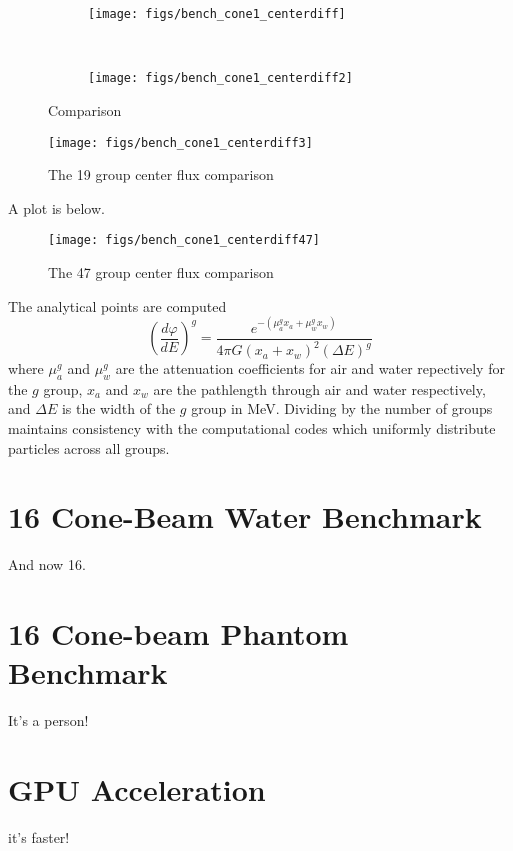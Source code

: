 \begin{figure}
    \centering
    \begin{subfigure}[b]{0.45\textwidth}
        \texttt{[image: figs/bench\_cone1\_centerdiff]}
        \caption{}
        \label{fig:bench_cone1_centerdiff}
    \end{subfigure}
    ~
    \begin{subfigure}[b]{0.45\textwidth}
        \texttt{[image: figs/bench\_cone1\_centerdiff2]}
        \caption{}
        \label{fig:bench_cone1_centerdiff2}
    \end{subfigure}
    \caption{Comparison}\label{fig:bench_cone1_centerdifffig}
\end{figure}

\begin{figure}[tb]
  \begin{center}
   \texttt{[image: figs/bench\_cone1\_centerdiff3]}
  \end{center}
  \caption{The 19 group center flux comparison}
\label{fig:bench_cone1_centerdiff3}
\end{figure}

A plot is below.

\begin{figure}[tb]
  \begin{center}
   \texttt{[image: figs/bench\_cone1\_centerdiff47]}
  \end{center}
  \caption{The 47 group center flux comparison}
\label{fig:bench_cone1_centerdiff47}
\end{figure}

The analytical points are computed
\begin{equation}
\left(\frac{d\varphi}{dE}\right)^g = \frac{e^{-(\mu^g_a x_a + \mu^g_w x_w)}}{4\pi G (x_a + x_w)^2 (\Delta E)^g}
\end{equation}
where $\mu_a^g$ and $\mu_w^g$ are the attenuation coefficients for air and water repectively for the $g$ group, $x_a$ and $x_w$ are the pathlength through air and water respectively, and $\Delta E$ is the width of the $g$ group in MeV. Dividing by the number of groups maintains consistency with the computational codes which uniformly distribute particles across all groups.

\section{16 Cone-Beam Water Benchmark}

And now 16.

\section{16 Cone-beam Phantom Benchmark}

It's a person!

\section{GPU Acceleration}

it's faster!


\endinput

